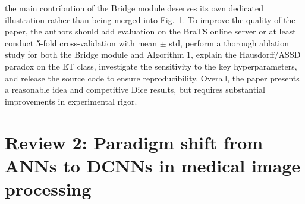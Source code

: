 \documentclass[12pt,a4paper]{article}
\begin{document}
the main contribution of the Bridge module deserves its own dedicated illustration rather than being merged into Fig.~1. To improve the quality of the paper, the authors should add evaluation on the BraTS online server or at least conduct 5-fold cross-validation with mean $\pm$ std, perform a thorough ablation study for both the Bridge module and Algorithm 1, explain the Hausdorff/ASSD paradox on the ET class, investigate the sensitivity to the key hyperparameters, and release the source code to ensure reproducibility. Overall, the paper presents a reasonable idea and competitive Dice results, but requires substantial improvements in experimental rigor.

\section{Review 2: Paradigm shift from ANNs to DCNNs in medical image processing}
\end{document}
